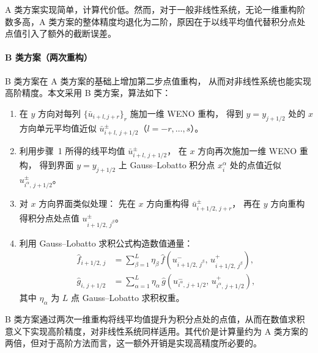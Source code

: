 \documentclass[12pt,a4paper]{article}
\numberwithin{equation}{section}    %
\begin{document}
A 类方案实现简单，计算代价低。然而，对于一般非线性系统，无论一维重构阶数多高，A 类方案的整体精度均退化为二阶，原因在于以线平均值代替积分点处点值引入了额外的截断误差。


\paragraph{B 类方案（两次重构）}

B 类方案在 A 类方案的基础上增加第二步点值重构，
从而对非线性系统也能实现高阶精度。本文采用 B 类方案，算法如下：

\begin{enumerate}
    \item 在 $y$ 方向对每列 $\{\bar{u}_{i+l, j+r}\}_{r}$ 施加一维 WENO 重构，
          得到 $y = y_{j+1/2}$ 处的 $x$ 方向单元平均值近似
          $\bar{u}^{\pm}_{i+l,\, j+1/2}$（$l = -r, \ldots, s$）。

    \item 利用步骤~1 所得的线平均值 $\bar{u}^{\pm}_{i+l,\, j+1/2}$，
          在 $x$ 方向再次施加一维 WENO 重构，
          得到界面 $y = y_{j+1/2}$ 上 Gauss--Lobatto 积分点
          $x_i^\alpha$ 处的点值近似 $u^{\pm}_{i^\alpha,\, j+1/2}$。

    \item 对 $x$ 方向界面类似处理：
          先在 $x$ 方向重构得 $\bar{u}^{\pm}_{i+1/2,\, j+r}$，
          再在 $y$ 方向重构得积分点处点值 $u^{\pm}_{i+1/2,\, j^\beta}$。

    \item 利用 Gauss--Lobatto 求积公式构造数值通量：
          \begin{equation}
            \begin{aligned}
                \hat{f}_{i+1/2,\, j}
                &= \sum_{\beta=1}^{L} \eta_\beta\,
                \hat{f}\!\left(u^-_{i+1/2,\, j^\beta},\,
                u^+_{i+1/2,\, j^\beta}\right),\\
                \hat{g}_{i,\, j+1/2}
                &= \sum_{\alpha=1}^{L} \eta_\alpha\,
                \hat{g}\!\left(u^-_{i^\alpha,\, j+1/2},\,
                u^+_{i^\alpha,\, j+1/2}\right),
            \end{aligned}
          \end{equation}
          其中 $\eta_\alpha$ 为 $L$ 点 Gauss--Lobatto 求积权重。
\end{enumerate}

B 类方案通过两次一维重构将线平均值提升为积分点处的点值，从而在数值求积意义下实现高阶精度，对非线性系统同样适用。其代价是计算量约为 A 类方案的两倍，但对于高阶方法而言，这一额外开销是实现高精度所必要的。
\end{document}
